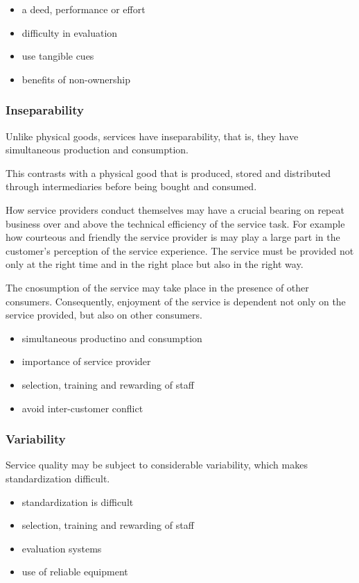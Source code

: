 \documentclass{article}
\begin{document}
\begin{itemize}
    \item a deed, performance or effort
    \item difficulty in evaluation
    \item use tangible cues
    \item benefits of non-ownership
\end{itemize}

\subsubsection*{Inseparability}
Unlike physical goods, services have inseparability, that is, they have simultaneous production and consumption. 

This contrasts with a physical good that is produced, stored and distributed through intermediaries before being bought and consumed.

How service providers conduct themselves may have a crucial bearing on repeat business over and above the technical efficiency of the service task. For example how courteous and friendly the service provider is may play a large part in the customer's perception of the service experience. The service must be provided not only at the right time and in the right place but also in the right way.

The cnosumption of the service may take place in the presence of other consumers. Consequently, enjoyment of the service is dependent not only on the service provided, but also on other consumers.

\begin{itemize}
    \item simultaneous productino and consumption
    \item importance of service provider
    \item selection, training and rewarding of staff
    \item avoid inter-customer conflict
\end{itemize}

\subsubsection*{Variability}
Service quality may be subject to considerable variability, which makes standardization difficult. 

\begin{itemize}
    \item standardization is difficult
    \item selection, training and rewarding of staff
    \item evaluation systems
    \item use of reliable equipment
\end{itemize}
\end{document}
